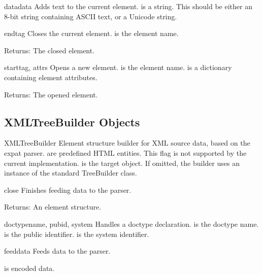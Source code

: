 \begin{methoddesc}{data}{data}
Adds text to the current element.
 is a string.  This should be either an 8-bit string
containing ASCII text, or a Unicode string.
\end{methoddesc}

\begin{methoddesc}{end}{tag}
Closes the current element.
 is the element name.

\begin{datadescni}{Returns:}
The closed element.
\end{datadescni}
\end{methoddesc}

\begin{methoddesc}{start}{tag, attrs}
Opens a new element.
 is the element name.
 is a dictionary containing element attributes.

\begin{datadescni}{Returns:}
The opened element.
\end{datadescni}
\end{methoddesc}


\subsection{XMLTreeBuilder Objects\label{elementtree-xmltreebuilder-objects}}

\begin{classdesc}{XMLTreeBuilder}{ }
Element structure builder for XML source data, based on the
expat parser.
 are predefined HTML entities.  This flag is not supported
by the current implementation.
 is the target object.  If omitted, the builder uses an
instance of the standard TreeBuilder class.
\end{classdesc}

\begin{methoddesc}{close}{}
Finishes feeding data to the parser.

\begin{datadescni}{Returns:}
An element structure.
\end{datadescni}
\end{methoddesc}

\begin{methoddesc}{doctype}{name, pubid, system}
Handles a doctype declaration.
 is the doctype name.
 is the public identifier.
 is the system identifier.
\end{methoddesc}

\begin{methoddesc}{feed}{data}
Feeds data to the parser.

 is encoded data.
\end{methoddesc}
